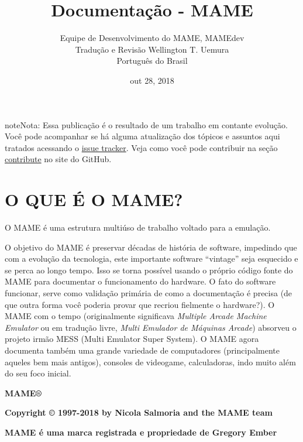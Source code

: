 \documentclass[letterpaper,10pt,brazil]{sphinxmanual}
\title{Documentação - MAME}
\date{out 28, 2018}
\author{Equipe de Desenvolvimento do MAME, MAMEdev \\Tradução e Revisão Wellington T. Uemura \\Português do Brasil}
\begin{document}
\maketitle
\tableofcontents
{}\label{index::doc}


\begin{notice}{note}{Nota:}
Essa publicação é o resultado de um trabalho em contante evolução.
Você pode acompanhar se há alguma atualização dos tópicos e assuntos
aqui tratados acessando o
\href{https://github.com/mamedev/mame/issues}{issue tracker}.
Veja como você pode contribuir na seção \href{https://github.com/mamedev/mame/blob/master/docs/CONTRIBUTING.md}{contribute} no
site do GitHub.
\end{notice}


\chapter{O QUE É O MAME?}
\label{whatis:o-que-e-o-mame}\label{whatis:documentacao-mame}\label{whatis::doc}
O MAME é uma estrutura multiúso de trabalho voltado para a emulação.

O objetivo do MAME é preservar décadas de história de software,
impedindo que com a evolução da tecnologia, este importante software
``vintage'' seja esquecido e se perca ao longo tempo. Isso se torna
possível usando o próprio código fonte do MAME para documentar o
funcionamento do hardware. O fato do software funcionar, serve como
validação primária de como a documentação é precisa (de que outra forma
você poderia provar que recriou fielmente o hardware?).
O MAME com o tempo (originalmente significava \emph{Multiple Arcade Machine
Emulator} ou em tradução livre, \emph{Multi Emulador de Máquinas Arcade})
absorveu o projeto irmão MESS (Multi Emulator Super System).
O MAME agora documenta também uma grande variedade de computadores
(principalmente aqueles bem mais antigos), consoles de videogame,
calculadoras, indo muito além do seu foco inicial.

\begin{DUlineblock}{0em}
\item[] 
\item[] \textbf{MAME®}
\item[] \textbf{Copyright © 1997-2018 by Nicola Salmoria and the MAME team}
\item[] \textbf{MAME é uma marca registrada e propriedade de Gregory Ember}
\item[] 
\end{DUlineblock}
\end{document}
